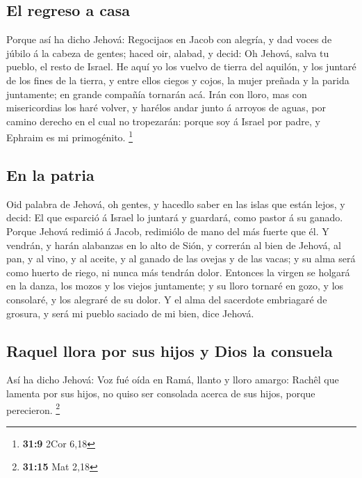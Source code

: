 \hypertarget{el-regreso-a-casa}{%
\subsection{El regreso a casa}\label{el-regreso-a-casa}}

 Porque así ha dicho Jehová: Regocijaos en Jacob con
alegría, y dad voces de júbilo á la cabeza de gentes; haced oir, alabad,
y decid: Oh Jehová, salva tu pueblo, el resto de Israel.  He
aquí yo los vuelvo de tierra del aquilón, y los juntaré de los fines de
la tierra, y entre ellos ciegos y cojos, la mujer preñada y la parida
juntamente; en grande compañía tornarán acá.  Irán con
lloro, mas con misericordias los haré volver, y harélos andar junto á
arroyos de aguas, por camino derecho en el cual no tropezarán: porque
soy á Israel por padre, y Ephraim es mi primogénito. \footnote{\textbf{31:9}
  2Cor 6,18}

\hypertarget{en-la-patria}{%
\subsection{En la patria}\label{en-la-patria}}

 Oid palabra de Jehová, oh gentes, y hacedlo saber en las
islas que están lejos, y decid: El que esparció á Israel lo juntará y
guardará, como pastor á su ganado.  Porque Jehová redimió á
Jacob, redimiólo de mano del más fuerte que él.  Y vendrán,
y harán alabanzas en lo alto de Sión, y correrán al bien de Jehová, al
pan, y al vino, y al aceite, y al ganado de las ovejas y de las vacas; y
su alma será como huerto de riego, ni nunca más tendrán dolor.
 Entonces la virgen se holgará en la danza, los mozos y los
viejos juntamente; y su lloro tornaré en gozo, y los consolaré, y los
alegraré de su dolor.  Y el alma del sacerdote embriagaré
de grosura, y será mi pueblo saciado de mi bien, dice Jehová.

\hypertarget{raquel-llora-por-sus-hijos-y-dios-la-consuela}{%
\subsection{Raquel llora por sus hijos y Dios la
consuela}\label{raquel-llora-por-sus-hijos-y-dios-la-consuela}}

 Así ha dicho Jehová: Voz fué oída en Ramá, llanto y lloro
amargo: Rachêl que lamenta por sus hijos, no quiso ser consolada acerca
de sus hijos, porque perecieron. \footnote{\textbf{31:15} Mat 2,18}

